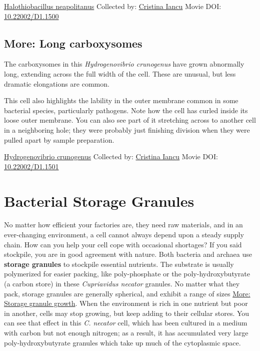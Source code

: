 \documentclass[]{tufte-book}
\begin{document}
\hypertarget{htmlwidget-9e310e97306fd30c663d}{}

\label{fig:4-7a}\protect\hyperlink{tree}{Halothiobacillus neapolitanus} Collected by: \protect\hyperlink{cristina_iancu}{Cristina Iancu} Movie DOI: \href{https://doi.org/10.22002/D1.1500}{10.22002/D1.1500}

\hypertarget{Long_carboxysomes}{%
\subsection*{More: Long carboxysomes}\label{Long_carboxysomes}}

The carboxysomes in this \emph{Hydrogenovibrio crunogenus} have grown abnormally long, extending across the full width of the cell. These are unusual, but less dramatic elongations are common.

This cell also highlights the lability in the outer membrane common in some bacterial species, particularly pathogens. Note how the cell has curled inside its loose outer membrane. You can also see part of it stretching across to another cell in a neighboring hole; they were probably just finishing division when they were pulled apart by sample preparation.



\hypertarget{htmlwidget-739550892f2c766b2c3f}{}

\label{fig:4-7b}\protect\hyperlink{tree}{Hydrogenovibrio crunogenus} Collected by: \protect\hyperlink{cristina_iancu}{Cristina Iancu} Movie DOI: \href{https://doi.org/10.22002/D1.1501}{10.22002/D1.1501}

\hypertarget{bacterial-storage-granules}{%
\section{Bacterial Storage Granules}\label{bacterial-storage-granules}}

No matter how efficient your factories are, they need raw materials, and in an ever-changing environment, a cell cannot always depend upon a steady supply chain. How can you help your cell cope with occasional shortages? If you said stockpile, you are in good agreement with nature. Both bacteria and archaea use \textbf{storage granules} to stockpile essential nutrients. The substrate is usually polymerized for easier packing, like poly-phosphate or the poly-hydroxybutyrate (a carbon store) in these \emph{Cupriavidus necator} granules. No matter what they pack, storage granules are generally spherical, and exhibit a range of sizes \protect\hyperlink{Storage_granule_growth}{More: Storage granule growth}. When the environment is rich in one nutrient but poor in another, cells may stop growing, but keep adding to their cellular stores. You can see that effect in this \emph{C. necator} cell, which has been cultured in a medium with carbon but not enough nitrogen; as a result, it has accumulated very large poly-hydroxybutyrate granules which take up much of the cytoplasmic space.
\end{document}
